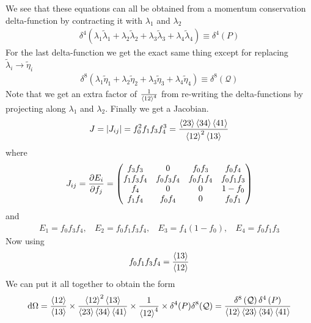 \documentclass[a4paper,12pt]{article}
\begin{document}
We see that these equations can all be obtained from a momentum conservation delta-function by contracting it with $\lambda_1$ and $\lambda_2$
\begin{equation}
\begin{aligned}
	\delta^{4}(\lambda_1\tilde\lambda_1+\lambda_2\tilde\lambda_2+\lambda_3\tilde\lambda_3+\lambda_4\tilde\lambda_4)\equiv \delta^{4}\left(P\right)
\end{aligned}
\end{equation}
For the last delta-function we get the exact same thing except for replacing $\tilde \lambda_i\to \tilde \eta_i$
\begin{equation}
\begin{aligned}
	\delta^{8}(\lambda_1\tilde\eta_1+\lambda_2\tilde\eta_2+\lambda_3\tilde\eta_3+\lambda_4\tilde\eta_4)\equiv \delta^{8}\left(\mathcal{Q}\right)
\end{aligned}
\end{equation}
Note that we get an extra factor of $\frac{1}{\expval{12}^4}$ from re-writing the delta-functions by projecting along $\lambda_1$ and $\lambda_2$. Finally we get a Jacobian.
\begin{equation}
	\begin{aligned}
		J=\left|J_{ij}\right|=f_0^2f_1f_3f_4^3=\frac{\expval{23}\expval{34}\expval{41}}{\expval{12}^2\expval{13}}
	\end{aligned}
\end{equation}
where
\begin{equation}
	\begin{aligned}
		J_{ij}=\pdv{E_i}{f_j}=\begin{pmatrix}
			f_3f_3 & 0 & f_0f_3 & f_0f_4\\
			f_1f_3f_4 &f_0f_3f_4 &f_0f_1f_4 & f_0f_1f_3\\
			f_4 & 0 & 0 & 1-f_0\\
			f_1f_4 & f_0f_4 & 0 & f_0f_1
		\end{pmatrix}
	\end{aligned}
\end{equation}
and 
\begin{equation}
	\begin{aligned}
		E_1=f_0f_3f_4,~~~~E_2=f_0f_1f_3f_4,~~~~E_3=f_4(1-f_0),~~~~E_4=f_0f_1f_3
	\end{aligned}
\end{equation}
Now using
\begin{equation}
	\begin{aligned}
		f_0f_1f_3f_4=\frac{\expval{13}}{\expval{12}}
	\end{aligned}
\end{equation}
We can put it all together to obtain the form
\begin{equation}
	\begin{aligned}
		\dd \Omega =\frac{\expval{12}}{\expval{13}}\times \frac{\expval{12}^2\expval{13}}{
			\expval{23}\expval{34}\expval{41}}\times \frac{1}{\expval{12}^4}\times \delta^4(P)\delta^8(\mathcal{Q})=\frac{\delta^{8}\left(\mathcal{Q}\right)\delta^{4}\left(P\right)}{\expval{12}\expval{23}\expval{34}\expval{41}}
	\end{aligned}
\end{equation}
\end{document}
